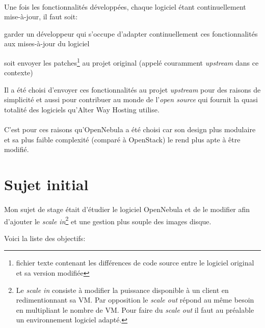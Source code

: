 \paragraph*{}
Une fois les fonctionnalités développées, chaque logiciel étant continuellement mise-à-jour, il faut soit:
\begin{listi}
	\item garder un développeur qui s'occupe d'adapter continuellement ces fonctionnalités aux mises-à-jour du logiciel
	\item soit envoyer les patches\footnote{fichier texte contenant les différences de code source entre le logiciel original et sa version modifiée}
		au projet original (appelé couramment \emph{upstream} dans ce contexte)
\end{listi}

Il a été choisi d'envoyer ces fonctionnalités au projet \emph{upstream} pour des raisons de simplicité et aussi pour contribuer au monde de
l'\emph{open source} qui fournit la quasi totalité des logiciels qu'Alter Way Hosting utilise.

\paragraph*{}
C'est pour ces raisons qu'OpenNebula a été choisi car son design plus modulaire et sa plus faible complexité (comparé à OpenStack) le rend
plus apte à être modifié.

\section{Sujet initial}
\paragraph*{}
Mon sujet de stage était d'étudier le logiciel OpenNebula et de le modifier afin d'ajouter le \emph{scale in}\footnote{Le \emph{scale in} consiste à
modifier la puissance disponible à un client en redimentionnant sa VM. Par opposition le \emph{scale out} répond au même besoin en multipliant le nombre de VM.
Pour faire du \emph{scale out} il faut au préalable un environnement logiciel adapté.} et une gestion plus souple des images disque.

Voici la liste des objectifs:


